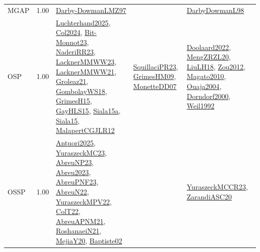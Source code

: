 {\begin{longtable}{p{3cm}r>{\raggedright\arraybackslash}p{6cm}>{\raggedright\arraybackslash}p{6cm}>{\raggedright\arraybackslash}p{8cm}}
\index{MGAP}\index{Classification!MGAP}MGAP &  1.00 & \hyperref[detail:Darby-DowmanLMZ97]{Darby-DowmanLMZ97} &  & \hyperref[detail:DarbyDowmanL98]{DarbyDowmanL98}\\
\index{OSP}\index{Classification!OSP}OSP &  1.00 & \hyperref[detail:Luchterhand2025]{Luchterhand2025}, \hyperref[detail:Col2024]{Col2024}, \hyperref[detail:Bit-Monnot23]{Bit-Monnot23}, \hyperref[detail:NaderiRR23]{NaderiRR23}, \hyperref[detail:LacknerMMWW23]{LacknerMMWW23}, \hyperref[detail:LacknerMMWW21]{LacknerMMWW21}, \hyperref[detail:Groleaz21]{Groleaz21}, \hyperref[detail:GombolayWS18]{GombolayWS18}, \hyperref[detail:GrimesH15]{GrimesH15}, \hyperref[detail:GayHLS15]{GayHLS15}, \hyperref[detail:Siala15a]{Siala15a}, \hyperref[detail:Siala15]{Siala15}, \hyperref[detail:MalapertCGJLR12]{MalapertCGJLR12} & \hyperref[detail:SquillaciPR23]{SquillaciPR23}, \hyperref[detail:GrimesHM09]{GrimesHM09}, \hyperref[detail:MonetteDD07]{MonetteDD07} & \hyperref[detail:Doolaard2022]{Doolaard2022}, \hyperref[detail:MengZRZL20]{MengZRZL20}, \hyperref[detail:LiuLH18]{LiuLH18}, \hyperref[detail:Zou2012]{Zou2012}, \hyperref[detail:Magato2010]{Magato2010}, \hyperref[detail:Ouaja2004]{Ouaja2004}, \hyperref[detail:Dorndorf2000]{Dorndorf2000}, \hyperref[detail:Weil1992]{Weil1992}\\
\index{OSSP}\index{Classification!OSSP}OSSP &  1.00 & \hyperref[detail:Antuori2025]{Antuori2025}, \hyperref[detail:YuraszeckMC23]{YuraszeckMC23}, \hyperref[detail:AbreuNP23]{AbreuNP23}, \hyperref[detail:Abreu2023]{Abreu2023}, \hyperref[detail:AbreuPNF23]{AbreuPNF23}, \hyperref[detail:AbreuN22]{AbreuN22}, \hyperref[detail:YuraszeckMPV22]{YuraszeckMPV22}, \hyperref[detail:ColT22]{ColT22}, \hyperref[detail:AbreuAPNM21]{AbreuAPNM21}, \hyperref[detail:RoshanaeiN21]{RoshanaeiN21}, \hyperref[detail:MejiaY20]{MejiaY20}, \hyperref[detail:Baptiste02]{Baptiste02} &  & \hyperref[detail:YuraszeckMCCR23]{YuraszeckMCCR23}, \hyperref[detail:ZarandiASC20]{ZarandiASC20}\\

\end{longtable}}
